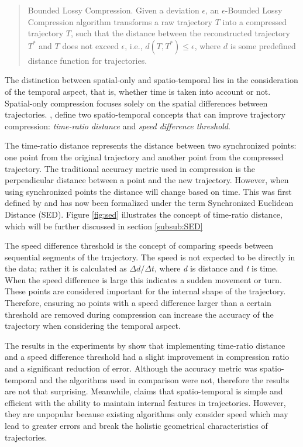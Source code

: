 \begin{quote}
    \begin{definition}\label{def:bounded_lossy}
        Bounded Lossy Compression. Given a deviation $\epsilon$, an $\epsilon$-Bounded Lossy Compression algorithm transforms a raw trajectory $T$ into a compressed trajectory $T$, such that the distance between the reconstructed trajectory $T^*$ and $T$ does not exceed $\epsilon$, i.e., $d(T,T^*) \leq \epsilon$, where $d$ is some predefined distance function for trajectories.
    \end{definition}
\end{quote}

The distinction between spatial-only and spatio-temporal lies in the consideration of the temporal aspect, that is, whether time is taken into account or not. Spatial-only compression focuses solely on the spatial differences between trajectories. \textcite{SpatiotemporalComp}, define two spatio-temporal concepts that can improve trajectory compression: \textit{time-ratio distance} and \textit{speed difference threshold}.

The time-ratio distance represents the distance between two synchronized points: one point from the original trajectory and another point from the compressed trajectory. The traditional accuracy metric used in compression is the perpendicular distance between a point and the new trajectory. However, when using synchronized points the distance will change based on time. This was first defined by \textcite{SpatiotemporalComp} and has now been formalized under the term Synchronized Euclidean Distance (SED). Figure \ref{fig:sed} illustrates the concept of time-ratio distance, which will be further discussed in section \ref{subsub:SED}

The speed difference threshold is the concept of comparing speeds between sequential segments of the trajectory. The speed is not expected to be directly in the data; rather it is calculated as $ \Delta d / \Delta t $, where \textit{d} is distance and \textit{t} is time. When the speed difference is large this indicates a sudden movement or turn. These points are considered important for the internal shape of the trajectory. Therefore, ensuring no points with a speed difference larger than a certain threshold are removed during compression can increase the accuracy of the trajectory when considering the temporal aspect.

The results in the experiments by \textcite{SpatiotemporalComp} show that implementing time-ratio distance and a speed difference threshold had a slight improvement in compression ratio and a significant reduction of error. Although the accuracy metric was spatio-temporal and the algorithms used in comparison were not, therefore the results are not that surprising. Meanwhile, \textcite{Sun2016} claims that spatio-temporal is simple and efficient with the ability to maintain internal features in trajectories. However, they are unpopular because existing algorithms only consider speed which may lead to greater errors and break the holistic geometrical characteristics of trajectories.


